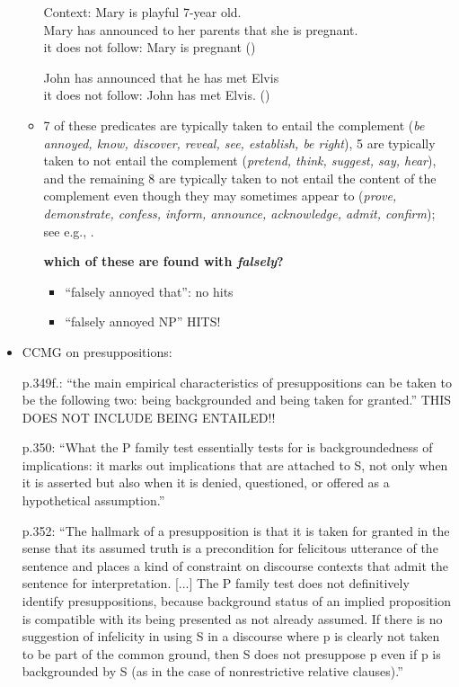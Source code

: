 \documentclass[11pt,fleqn]{article}
\newcommand{\6}{\mbox{$[\hspace*{-.6mm}[$}}
\newcommand{\9}{\mbox{$]\hspace*{-.6mm}]$}}
\begin{document}
\begin{itemize}
\begin{itemize}
\begin{exe}
\begin{xlist}
\ex Context: Mary is playful 7-year old.
\\ Mary has announced to her parents that she is pregnant. 
\\ it does not follow: Mary is pregnant \hfill (\citealt[140]{schlenker10})

\ex John has announced that he has met Elvis
\\ it does not follow: John has met Elvis. \hfill (\citealt[140]{schlenker10})
\end{xlist}
\end{exe}

\item 7 of these predicates are typically taken to entail the complement ({\em be annoyed, know, discover, reveal, see, establish, be right}), 5 are typically taken to not entail the complement ({\em pretend, think, suggest, say, hear}), and the remaining 8 are typically taken to not entail the content of the complement even though they may sometimes appear to ({\em prove, demonstrate, confess, inform, announce, acknowledge, admit, confirm}); see e.g., \citealt{schlenker10,swanson2012,anand-hacquard2014}.

{\bf which of these are found with {\em falsely}?}

\begin{itemize}

\item ``falsely annoyed that'': no hits

\item ``falsely annoyed NP'' HITS!


\end{itemize}

\end{itemize}


\item CCMG on presuppositions:

p.349f.: ``the main empirical characteristics of presuppositions can be taken to be the following two: being backgrounded and being taken for granted.'' THIS DOES NOT INCLUDE BEING ENTAILED!! 

p.350: ``What the P family test essentially tests for is backgroundedness of implications: it marks out implications that are attached to S, not only when it is asserted but also when it is denied, questioned, or offered as a hypothetical assumption.''

p.352: ``The hallmark of a presupposition is that it is taken for granted in the sense that its assumed truth is a precondition for felicitous utterance of the sentence and places a kind of constraint on discourse contexts that admit the sentence for interpretation. [...] The P family test does not definitively identify presuppositions, because background status of an implied proposition is compatible with its being presented as not already assumed. If there is no suggestion of infelicity in using S in a discourse where p is clearly not taken to be part of the common ground, then S does not presuppose p even if p is backgrounded by S (as in the case of nonrestrictive relative clauses).''


\end{itemize}
\end{document}
